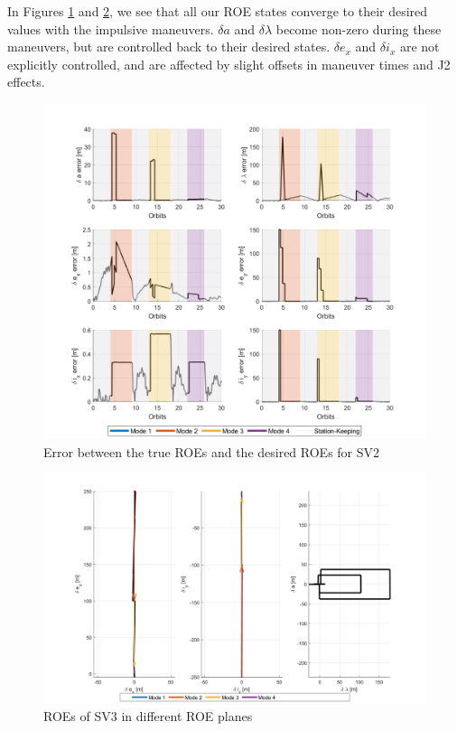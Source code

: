 In Figures \ref{fig:roe_error_control_sv3} and \ref{fig:roe_final_SV3_planes}, we see that all our ROE states converge to their desired values with the impulsive maneuvers. $\delta a$ and $\delta \lambda$ become non-zero during these maneuvers, but are controlled back to their desired states. $\delta e_x$ and $\delta i_x$ are not explicitly controlled, and are affected by slight offsets in maneuver times and J2 effects.
\begin{figure}[H]
    \centering
    \includegraphics[width=0.7\linewidth]{sim/figures/PS9/ROE_error_over_time_modes_SV3.png}
    \caption{Error between the true ROEs and the desired ROEs for SV2}
    \label{fig:roe_error_control_sv3}
\end{figure}

\begin{figure}[H]
    \centering
    \includegraphics[width=0.7\linewidth]{sim/figures/PS9/ROE_planes_modes_SV3.png}
    \caption{ROEs of SV3 in different ROE planes}
    \label{fig:roe_final_SV3_planes}
\end{figure}

